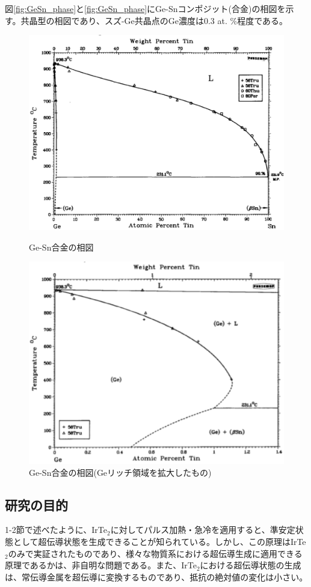 図\ref{fig:GeSn_phase}と\ref{fig:GeSn_phase}にGe-Snコンポジット(合金)の相図を示す\cite{Olesinski1984}。共晶型の相図であり、スズ-Ge共晶点のGe濃度は0.3 at. \%程度である\cite{Olesinski1984,Thurmond1960}。
\begin{figure}[!h]
 \begin{minipage}{\hsize}
    \begin{center}
   \includegraphics[width=0.7\hsize]{Introduction/GeSn_phase.eps}
  \end{center}
  \caption{Ge-Sn合金の相図\cite{Olesinski1984}}
  \label{fig:GeSn_phase}
 \end{minipage}
 \begin{minipage}{\hsize}
    \begin{center}
   \includegraphics[width=0.7\hsize]{Introduction/GeSn_phase2.eps}
  \end{center}
  \caption{Ge-Sn合金の相図(Geリッチ領域を拡大したもの)\cite{Olesinski1984}}
  \label{fig:GeSn_phase2}
   \end{minipage}
\end{figure}

\clearpage

\subsection{研究の目的}
1-2節で述べたように、IrTe$_2$に対してパルス加熱・急冷を適用すると、準安定状態として超伝導状態を生成できることが知られている。しかし、この原理はIrTe$_2$のみで実証されたものであり、様々な物質系における超伝導生成に適用できる原理であるかは、非自明な問題である。また、IrTe$_2$における超伝導状態の生成は、常伝導金属を超伝導に変換するものであり、抵抗の絶対値の変化は小さい。

